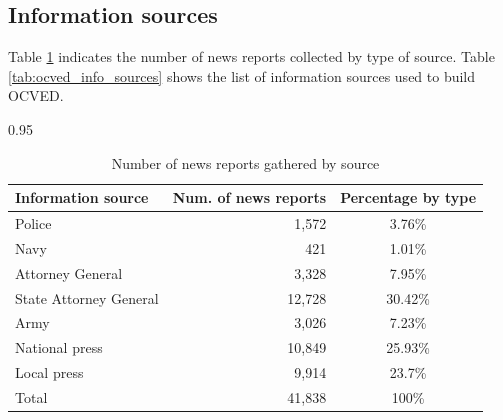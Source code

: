 \documentclass[12pt,letterpaper]{article}
\begin{document}


\subsection{Information sources}

Table \ref{number_of_news_reports} indicates the number of news reports collected by type of source. Table \ref{tab:ocved_info_sources} shows the list of information sources used to build OCVED.






\begin{table}[h!]
\small
    \caption{Number of news reports gathered by source}
    \label{number_of_news_reports}
\begin{spacing}{0.95}
    \centering
    \begin{tabular}{|l|r|c|}
        \hline
Information source  &  Num. of news reports  & Percentage by type   \\
\hline \hline
Police  &  1,572  & 3.76\%    \\
Navy  &  421  & 1.01\%   \\
Attorney General   &  3,328  & 7.95\%   \\
State Attorney General   &  12,728  & 30.42\%   \\
Army  &  3,026  & 7.23\%   \\
National press  &  10,849  & 25.93\%   \\
Local press  &  9,914  & 23.7\%    \\
\hline
Total   &  41,838  & 100\%   \\
\hline  
\end{tabular}
\end{spacing}
\end{table}





\end{document}
